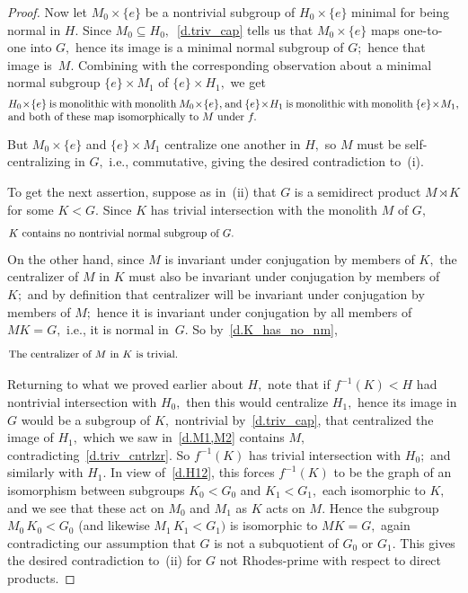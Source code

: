 \documentclass[10pt,a4paper]{amsart}
\begin{document}
\begin{proof}
Now let $M_0\times\{e\}$ be a nontrivial subgroup of
$H_0\times\{e\}$ minimal for being normal in $H.$
Since $M_0\subseteq H_0,$~\eqref{d.triv_cap} tells us
that $M_0\times\{e\}$ maps one-to-one into $G,$ hence its
image is a minimal normal subgroup of $G;$ hence that image is~$M.$
Combining with the corresponding observation about
a minimal normal subgroup $\{e\}\times M_1$ of
$\{e\}\times H_1,$ we get
%
\begin{equation}\begin{minipage}[c]{35pc}\label{d.M1,M2}
$H_0\times \{e\}$ is monolithic with monolith $M_0\times\{e\},$
and $\{e\}\times H_1$ is monolithic with monolith
$\{e\}\times M_1,$ and both of these map
isomorphically to $M$ under $f.$
\end{minipage}\end{equation}

But $M_0\times\{e\}$ and $\{e\}\times M_1$
centralize one another in $H,$ so $M$ must be
self-centralizing in $G,$ i.e., commutative,
giving the desired contradiction to~(i).

To get the next assertion, suppose as in~(ii)
that $G$ is a semidirect product $M\rtimes K$ for some $K<G.$
Since $K$ has trivial intersection with the monolith $M$ of $G,$
%
\begin{equation}\begin{minipage}[c]{35pc}\label{d.K_has_no_nm}
$K$ contains no nontrivial normal subgroup of~$G.$
\end{minipage}\end{equation}
%
On the other hand, since $M$ is invariant under conjugation by
members of $K,$ the centralizer of $M$ in $K$ must also be invariant
under conjugation by members of $K;$ and by definition that
centralizer will be invariant under conjugation by members of $M;$
hence it is invariant under conjugation by
all members of $MK=G,$ i.e., it is normal in~$G.$
So by~\eqref{d.K_has_no_nm},
%
\begin{equation}\begin{minipage}[c]{35pc}\label{d.triv_cntrlzr}
The centralizer of $M$ in $K$ is trivial.
\end{minipage}\end{equation}

Returning to what we proved earlier about $H,$ note that
if $f^{-1}(K) < H$ had nontrivial intersection with
$H_0,$ then this would centralize $H_1,$ hence its image
in $G$ would be a subgroup of $K,$ nontrivial by~\eqref{d.triv_cap},
that centralized the image of $H_1,$ which we saw in~\eqref{d.M1,M2}
contains $M,$ contradicting~\eqref{d.triv_cntrlzr}.
So $f^{-1}(K)$ has trivial intersection with $H_0;$ and
similarly with $H_1.$
In view of~\eqref{d.H12}, this
forces $f^{-1}(K)$ to be the graph of an isomorphism between subgroups
$K_0 < G_0$ and $K_1 < G_1,$ each isomorphic to $K,$ and we see
that these act on $M_0$ and $M_1$ as $K$ acts on $M.$
Hence the
subgroup $M_0\,K_0 < G_0$ (and likewise $M_1\,K_1 < G_1)$ is isomorphic
to $MK = G,$ again contradicting our assumption that $G$ is not
a subquotient of $G_0$ or $G_1.$
This gives the desired contradiction to~(ii) for
$G$ not Rhodes-prime with respect to direct products.


\end{proof}
\end{document}
